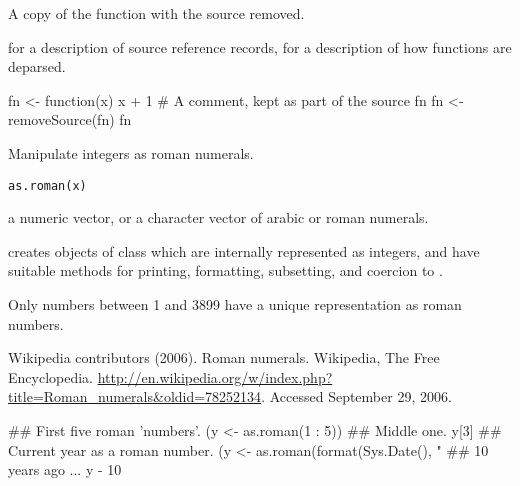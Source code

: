 %
\begin{Value}
A copy of the function with the source removed.
\end{Value}
%
\begin{SeeAlso}\relax
{} for a description of source reference records,
 for a description of how functions are deparsed.
\end{SeeAlso}
%
\begin{Examples}
\begin{ExampleCode}
fn <- function(x) {
  x + 1 # A comment, kept as part of the source
}
fn
fn <- removeSource(fn)
fn
\end{ExampleCode}
\end{Examples}
%
\begin{Description}\relax
Manipulate integers as roman numerals.
\end{Description}
%
\begin{Usage}
\begin{verbatim}
as.roman(x)
\end{verbatim}
\end{Usage}
%
\begin{Arguments}
\begin{ldescription}
\item[\code{x}] a numeric vector, or a character vector of arabic or roman
numerals.
\end{ldescription}
\end{Arguments}
%
\begin{Details}\relax
{} creates objects of class  which are
internally represented as integers, and have suitable methods for
printing, formatting, subsetting, and coercion to .

Only numbers between 1 and 3899 have a unique representation as roman
numbers.
\end{Details}
%
\begin{References}\relax
Wikipedia contributors (2006). Roman numerals.
Wikipedia, The Free Encyclopedia.
\url{http://en.wikipedia.org/w/index.php?title=Roman_numerals&oldid=78252134}.
Accessed September 29, 2006.
\end{References}
%
\begin{Examples}
\begin{ExampleCode}
## First five roman 'numbers'.
(y <- as.roman(1 : 5))
## Middle one.
y[3]
## Current year as a roman number.
(y <- as.roman(format(Sys.Date(), "%
## 10 years ago ...
y - 10
\end{ExampleCode}
\end{Examples}
